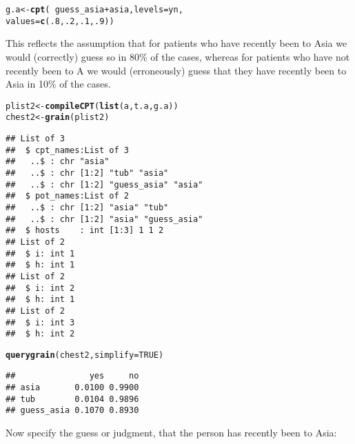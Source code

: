 \documentclass[10pt]{article}\usepackage[]{graphicx}\usepackage[]{xcolor}
\makeatletter
\newcommand{\hlnum}[1]{\textcolor[rgb]{0.686,0.059,0.569}{#1}}%
\newcommand{\hlopt}[1]{\textcolor[rgb]{0,0,0}{#1}}%
\newcommand{\hlstd}[1]{\textcolor[rgb]{0.345,0.345,0.345}{#1}}%
\newcommand{\hlkwb}[1]{\textcolor[rgb]{0.69,0.353,0.396}{#1}}%
\newcommand{\hlkwc}[1]{\textcolor[rgb]{0.333,0.667,0.333}{#1}}%
\newcommand{\hlkwd}[1]{\textcolor[rgb]{0.737,0.353,0.396}{\textbf{#1}}}%
\newenvironment{kframe}{%
 \def\at@end@of@kframe{}%
 \ifinner\ifhmode%
  \def\at@end@of@kframe{\end{minipage}}%
  \begin{minipage}{\columnwidth}%
 \fi\fi%
 \def\FrameCommand##1{\hskip\@totalleftmargin \hskip-\fboxsep
 \colorbox{shadecolor}{##1}\hskip-\fboxsep
     \hskip-\linewidth \hskip-\@totalleftmargin \hskip\columnwidth}%
 \MakeFramed {\advance\hsize-\width
   \@totalleftmargin\z@ \linewidth\hsize
   \@setminipage}}%
 {\par\unskip\endMakeFramed%
 \at@end@of@kframe}
\newenvironment{knitrout}{}{} %
\makeatother
\begin{document}
\begin{knitrout}
\color{fgcolor}\begin{kframe}
\begin{alltt}
\hlstd{g.a} \hlkwb{<-} \hlkwd{cpt}\hlstd{(}\hlopt{~}\hlstd{guess_asia}\hlopt{+}\hlstd{asia,} \hlkwc{levels}\hlstd{=yn,}
              \hlkwc{values}\hlstd{=}\hlkwd{c}\hlstd{(}\hlnum{.8}\hlstd{,} \hlnum{.2}\hlstd{,} \hlnum{.1}\hlstd{,} \hlnum{.9}\hlstd{))}
\end{alltt}
\end{kframe}
\end{knitrout}

This reflects the assumption that for patients who have recently been
to Asia we would (correctly) guess so in 80\% of the cases, whereas for patients who have
not recently been to A we would (erroneously) guess that they have
recently been to Asia in 10\% of the cases.

\begin{knitrout}
\color{fgcolor}\begin{kframe}
\begin{alltt}
\hlstd{plist2} \hlkwb{<-} \hlkwd{compileCPT}\hlstd{(}\hlkwd{list}\hlstd{(a, t.a, g.a ))}
\hlstd{chest2} \hlkwb{<-} \hlkwd{grain}\hlstd{(plist2)}
\end{alltt}
\begin{verbatim}
## List of 3
##  $ cpt_names:List of 3
##   ..$ : chr "asia"
##   ..$ : chr [1:2] "tub" "asia"
##   ..$ : chr [1:2] "guess_asia" "asia"
##  $ pot_names:List of 2
##   ..$ : chr [1:2] "asia" "tub"
##   ..$ : chr [1:2] "asia" "guess_asia"
##  $ hosts    : int [1:3] 1 1 2
## List of 2
##  $ i: int 1
##  $ h: int 1
## List of 2
##  $ i: int 2
##  $ h: int 1
## List of 2
##  $ i: int 3
##  $ h: int 2
\end{verbatim}
\begin{alltt}
\hlkwd{querygrain}\hlstd{(chest2,} \hlkwc{simplify} \hlstd{=} \hlnum{TRUE}\hlstd{)}
\end{alltt}
\begin{verbatim}
##               yes     no
## asia       0.0100 0.9900
## tub        0.0104 0.9896
## guess_asia 0.1070 0.8930
\end{verbatim}
\end{kframe}
\end{knitrout}


Now specify the guess or judgment, that the person has recently been
to Asia:
\end{document}
